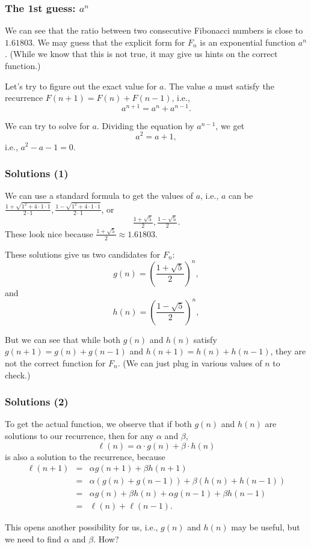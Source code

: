 \begin{frame}\frametitle{The 1st guess: $a^n$}
  We can see that the ratio between two consecutive Fibonacci numbers
  is close to $1.61803$.  We may guess that the explicit form for
  $F_n$ is an exponential function $a^n$.  (While we know that this is
  not true, it may give us hints on the correct function.)

  \vspace{0.1in}
  Let's try to figure out the exact value for $a$.  The value $a$ must
  satisfy the recurrence $F(n+1)=F(n)+F(n-1)$, i.e.,
  \[ a^{n+1}=a^n+a^{n-1}. \]

  \vspace{0.1in} We can try to solve for $a$.  Dividing the
  equation by $a^{n-1}$, we get
  \[ a^2 = a + 1, \]
  i.e., $a^2-a-1 = 0$.
\end{frame}

\begin{frame}\frametitle{Solutions (1)}
  We can use a standard formula to get the values of $a$, i.e., $a$
  can be $\frac{1+\sqrt{1^2+4\cdot 1\cdot 1}}{2\cdot 1},
  \frac{1-\sqrt{1^2+4\cdot 1\cdot 1}}{2\cdot 1}$,
  or
  \[ \tfrac{1+\sqrt{5}}{2},\tfrac{1-\sqrt{5}}{2}. \]
  These look nice because $\tfrac{1+\sqrt{5}}{2}\approx 1.61803$.

  \vspace{0.1in}
  These solutions give us two candidates for $F_n$:
  \[ g(n) = \left(\frac{1+\sqrt{5}}{2}\right)^n, \]
  and
  \[ h(n) = \left(\frac{1-\sqrt{5}}{2}\right)^n, \]
  
  \vspace{0.1in}
  But we can see that while both $g(n)$ and $h(n)$ satisfy
  $g(n+1)=g(n)+g(n-1)$ and $h(n+1)=h(n)+h(n-1)$, they are not the
  correct function for $F_n$. (We can just plug in various values of
  $n$ to check.)
\end{frame}

\begin{frame}\frametitle{Solutions (2)}
  To get the actual function, we observe that if both $g(n)$ and
  $h(n)$ are solutions to our recurrence, then for any $\alpha$ and
  $\beta$,
  \[\ell(n) = \alpha\cdot g(n) + \beta\cdot h(n) \]
  is also a solution to the recurrence, because
  \begin{eqnarray*}
    \ell(n+1) &=& \alpha g(n+1) + \beta h(n+1) \\
    &=& \alpha (g(n)+g(n-1)) + \beta (h(n)+h(n-1)) \\
    &=& \alpha g(n) + \beta h(n) + \alpha g(n-1) + \beta h(n-1) \\
    &=& \ell(n) + \ell(n-1).
  \end{eqnarray*}

  \vspace{0.1in} This opens another possibility for us, i.e., $g(n)$
  and $h(n)$ may be useful, but we need to find $\alpha$ and $\beta$.
  How?
\end{frame}

